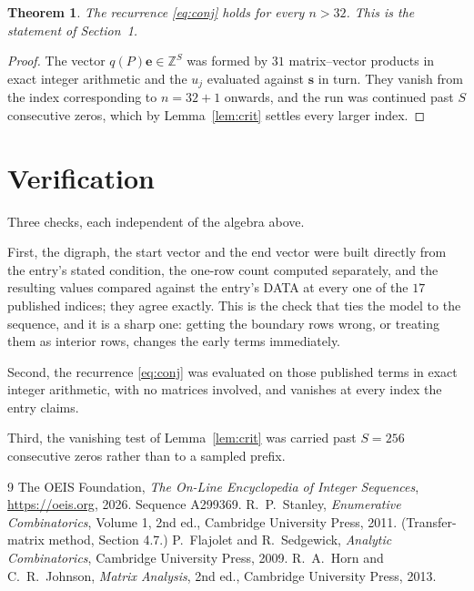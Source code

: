 \documentclass[11pt,a4paper]{article}
\theoremstyle{plain}
\newtheorem{theorem}{Theorem}
\theoremstyle{definition}
\begin{document}
\begin{theorem}
The recurrence \eqref{eq:conj} holds for every $n>32$. This is the statement of
Section~1.
\end{theorem}

\begin{proof}
The vector $q(P)\mathbf{e}\in\mathbb{Z}^{S}$ was formed by $31$ matrix--vector
products in exact integer arithmetic and the $u_j$ evaluated against $\mathbf{s}$ in turn.
They vanish from the index corresponding to $n=32+1$ onwards, and the run was continued
past $S$ consecutive zeros, which by Lemma~\ref{lem:crit} settles every larger index.
\end{proof}

\section{Verification}

Three checks, each independent of the algebra above.

First, the digraph, the start vector and the end vector were built directly from the
entry's stated condition, the one-row count computed separately, and the resulting values
compared against the entry's DATA at every one of the $17$ published indices; they
agree exactly. This is the check that ties the model to the sequence, and it is a sharp one:
getting the boundary rows wrong, or treating them as interior rows, changes the early terms
immediately.

Second, the recurrence \eqref{eq:conj} was evaluated on those published terms in exact
integer arithmetic, with no matrices involved, and vanishes at every index the entry claims.

Third, the vanishing test of Lemma~\ref{lem:crit} was carried past $S=256$ consecutive
zeros rather than to a sampled prefix.

\begin{thebibliography}{9}
 The OEIS Foundation, \emph{The On-Line Encyclopedia of Integer
Sequences}, \url{https://oeis.org}, 2026. Sequence A299369.
 R.~P.~Stanley, \emph{Enumerative Combinatorics}, Volume 1, 2nd ed.,
Cambridge University Press, 2011. (Transfer-matrix method, Section 4.7.)
 P.~Flajolet and R.~Sedgewick, \emph{Analytic Combinatorics}, Cambridge
University Press, 2009.
 R.~A.~Horn and C.~R.~Johnson, \emph{Matrix Analysis}, 2nd ed., Cambridge
University Press, 2013.
\end{thebibliography}
\end{document}
